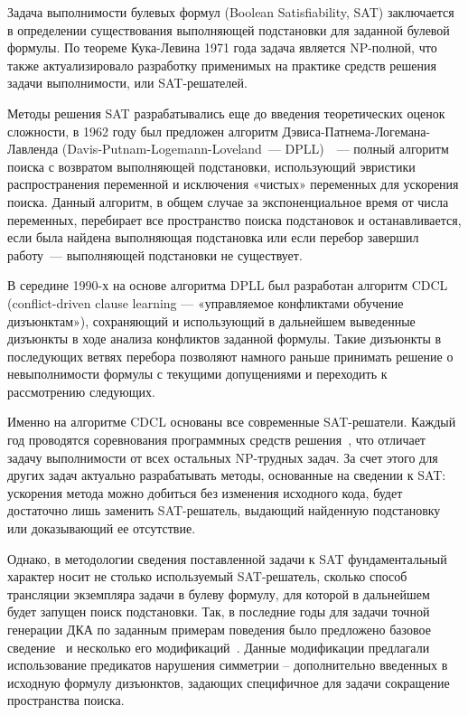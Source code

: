 Задача выполнимости булевых формул (Boolean Satisfiability, SAT) заключается в определении существования выполняющей подстановки для заданной булевой формулы. По теореме Кука-Левина 1971 года задача является NP-полной, что также актуализировало разработку применимых на практике средств решения задачи выполнимости, или SAT-решателей.

Методы решения SAT разрабатывались еще до введения теоретических оценок сложности, в 1962 году был предложен алгоритм Дэвиса-Патнема-Логемана-Лавленда (Davis-Putnam-Logemann-Loveland~--- DPLL)~\cite{DBLP:journals/cacm/DavisLL62}~--- полный алгоритм поиска с возвратом выполняющей подстановки, использующий эвристики распространения переменной и исключения «чистых» переменных для ускорения поиска. Данный алгоритм, в общем случае за экспоненциальное время от числа переменных, перебирает все пространство поиска подстановок и останавливается, если была найдена выполняющая подстановка или если перебор завершил работу~--- выполняющей подстановки не существует. 

В середине 1990-х на основе алгоритма DPLL был разработан алгоритм CDCL~\cite{DBLP:conf/iccad/SilvaS96} (conflict-driven clause learning — «управляемое конфликтами обучение дизъюнктам»), сохраняющий  и использующий в дальнейшем выведенные дизъюнкты в ходе анализа конфликтов заданной формулы. Такие дизъюнкты в последующих ветвях перебора позволяют намного раньше принимать решение о невыполнимости формулы с текущими допущениями и переходить к рассмотрению следующих.

Именно на алгоритме CDCL основаны все современные SAT-решатели. Каждый год проводятся соревнования программных средств решения~\cite{sat-competitions,sat-competition-2020}, что отличает задачу выполнимости от всех остальных NP-трудных задач. За счет этого для других задач актуально разрабатывать методы, основанные на сведении к SAT: ускорения метода можно добиться без изменения исходного кода, будет достаточно лишь заменить SAT-решатель, выдающий найденную подстановку или доказывающий ее отсутствие.

Однако, в методологии сведения поставленной задачи к SAT фундаментальный характер носит не столько используемый SAT-решатель, сколько способ трансляции экземпляра задачи в булеву формулу, для которой в дальнейшем будет запущен поиск подстановки. Так, в последние годы для задачи точной генерации ДКА по заданным примерам поведения было предложено базовое сведение~\cite{heule-icgi10} и несколько его модификаций~\cite{DBLP:journals/ese/HeuleV13,ulyantsev-phd-13}. Данные модификации предлагали использование предикатов нарушения симметрии – дополнительно введенных в исходную формулу дизъюнктов, задающих специфичное для задачи сокращение пространства поиска.

